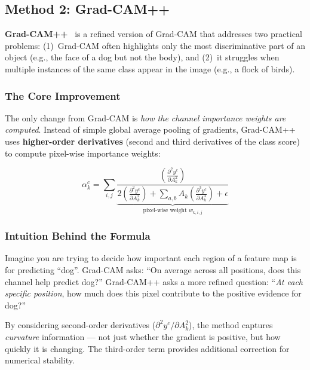 \documentclass[12pt, a4paper]{article}
\begin{document}
\subsection{Method 2: Grad-CAM++}

\textbf{Grad-CAM++}~\cite{chattopadhay2018gradcampp} is a refined version of
Grad-CAM that addresses two practical problems: (1)~Grad-CAM often highlights
only the most discriminative part of an object (e.g., the face of a dog but not
the body), and (2)~it struggles when multiple instances of the same class appear
in the image (e.g., a flock of birds).

\subsubsection{The Core Improvement}

The only change from Grad-CAM is \emph{how the channel importance weights are
computed}.  Instead of simple global average pooling of gradients, Grad-CAM++
uses \textbf{higher-order derivatives} (second and third derivatives of the
class score) to compute pixel-wise importance weights:

\begin{equation}
\alpha_k^c = \sum_{i,j} \underbrace{\frac{\left(\frac{\partial^2 y^c}{\partial A_k^2}\right)}
{2 \left(\frac{\partial^2 y^c}{\partial A_k^2}\right) +
\sum_{a,b} A_k \left(\frac{\partial^3 y^c}{\partial A_k^3}\right) + \epsilon}}_{\text{pixel-wise weight } w_{k,i,j}}
\end{equation}

\subsubsection{Intuition Behind the Formula}

Imagine you are trying to decide how important each region of a feature map is
for predicting ``dog''.  Grad-CAM asks: ``On average across all positions, does
this channel help predict dog?''  Grad-CAM++ asks a more refined question:
``\emph{At each specific position}, how much does this pixel contribute to the
positive evidence for dog?''

By considering second-order derivatives ($\partial^2 y^c / \partial A_k^2$),
the method captures \emph{curvature} information --- not just whether the
gradient is positive, but how quickly it is changing.  The third-order term
provides additional correction for numerical stability.
\end{document}
